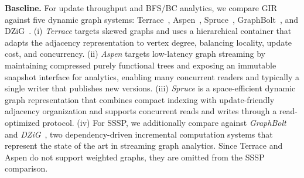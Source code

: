 \textbf{Baseline.}
For update throughput and BFS/BC analytics, we compare \textsc{GIR} against five dynamic graph systems: Terrace~\cite{pandey2021terrace}, Aspen~\cite{dhulipala2019low}, Spruce~\cite{shi2024spruce}, GraphBolt~\cite{mariappan2019graphbolt}, and DZiG~\cite{mariappan2021dzig}.
(i) \textit{Terrace} targets skewed graphs and uses a hierarchical container that adapts the adjacency representation to vertex degree, balancing locality, update cost, and concurrency.
(ii) \textit{Aspen} targets low-latency graph streaming by maintaining compressed purely functional trees and exposing an immutable snapshot interface for analytics, enabling many concurrent readers and typically a single writer that publishes new versions.
(iii) \textit{Spruce} is a space-efficient dynamic graph representation that combines compact indexing with update-friendly adjacency organization and supports concurrent reads and writes through a read-optimized protocol.
(iv) For SSSP, we additionally compare against \textit{GraphBolt}~\cite{mariappan2019graphbolt} and \textit{DZiG}~\cite{mariappan2021dzig}, two dependency-driven incremental computation systems that represent the state of the art in streaming graph analytics.
Since Terrace and Aspen do not support weighted graphs, they are omitted from the SSSP comparison.





